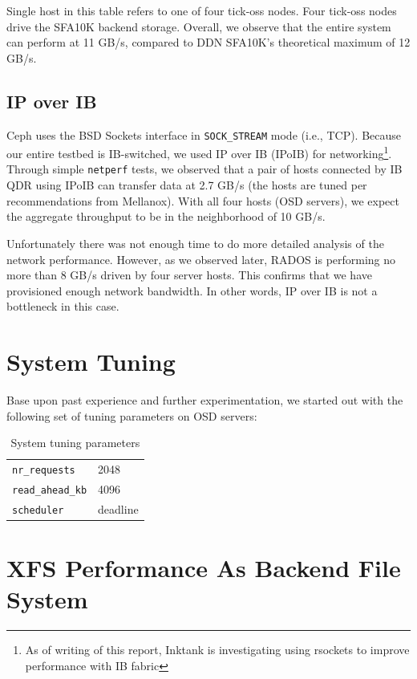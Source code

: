 \documentclass{article}
\begin{document}
Single host in this table refers to one of four tick-oss nodes. Four tick-oss
nodes drive the SFA10K backend storage. Overall, we observe that the entire
system can perform at 11 GB/s, compared to DDN SFA10K's theoretical maximum of
12 GB/s.


\subsection{IP over IB}

Ceph uses the BSD Sockets interface in \texttt{SOCK\_STREAM} mode (i.e., TCP).
Because our entire testbed is IB-switched, we used IP over IB (IPoIB) for
networking\footnote{As of writing of this report, Inktank is investigating using
rsockets to improve performance with IB fabric}. Through simple
\verb!netperf! tests, we observed that a pair of hosts connected by IB QDR using
IPoIB can transfer data at 2.7 GB/s (the hosts are tuned per recommendations
from Mellanox). With all four hosts (OSD servers), we expect the aggregate
throughput to be in the neighborhood of 10 GB/s.

Unfortunately there was not enough time to do more detailed analysis of the
network performance. However, as we observed later, RADOS is performing no
more than 8 GB/s driven by four server hosts. This confirms that we have
provisioned enough network bandwidth. In other words, IP over IB is not a
bottleneck in this case.


\section{System Tuning}

Base upon past experience and further experimentation, we started out with the
following set of tuning parameters on OSD servers:

\begin{table}[htb]
\centering
\begin{tabular}{ll}
    \toprule
    \verb!nr_requests! & 2048 \\
    \verb!read_ahead_kb! & 4096 \\
    \verb!scheduler! & deadline \\
    \bottomrule
\end{tabular}
\caption{System tuning parameters}
\end{table}



\section{XFS Performance As Backend File System}
\end{document}

